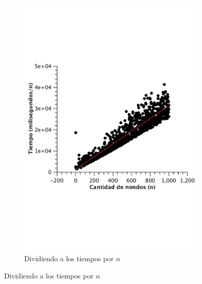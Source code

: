 \begin{figure}[H]
        \begin{subfigure}[b]{0.5\textwidth}
                \includegraphics[width=\textwidth]{imagenes/completo-matriz-2.pdf}
                \caption{Dividiendo a los tiempos por $n$}
        \end{subfigure}


\end{figure}
